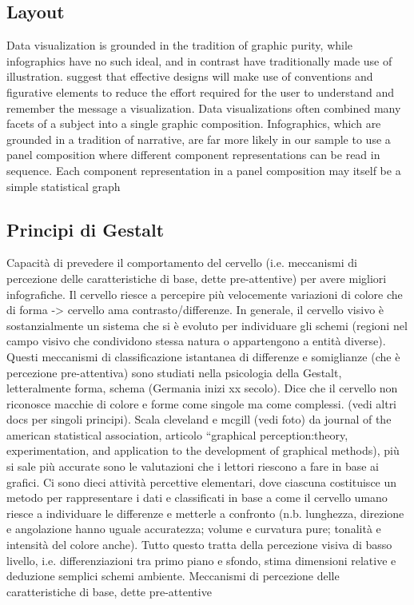 \subsection{Layout}\label{subsec:info_layout}

Data visualization is grounded in the tradition of graphic purity, while infographics have no such ideal, and in contrast have traditionally made use of illustration.
 suggest that effective designs will make use of conventions and figurative elements to reduce the effort required for the user to understand and remember the message a visualization.
Data
visualizations often combined many facets of a subject into a single
graphic composition. Infographics, which are grounded in a tradition
of narrative, are far more likely in our sample to use a panel
composition where different component representations can be read
in sequence. Each component representation in a panel composition
may itself be a simple statistical graph


\subsection{Principi di Gestalt}
Capacità di prevedere il comportamento del cervello (i.e. meccanismi di percezione delle caratteristiche di base, dette pre-attentive) per avere migliori infografiche.
Il cervello riesce a percepire più velocemente variazioni di colore che di forma -> cervello ama contrasto/differenze. In generale, il cervello visivo è sostanzialmente un sistema che si è evoluto per individuare gli schemi (regioni nel campo visivo che condividono stessa natura o appartengono a entità diverse). Questi meccanismi di classificazione istantanea di differenze e somiglianze (che è percezione pre-attentiva) sono studiati nella psicologia della Gestalt, letteralmente forma, schema (Germania inizi xx secolo). Dice che il cervello non riconosce macchie di colore e forme come singole ma come complessi.
(vedi altri docs per singoli principi).
Scala cleveland e mcgill (vedi foto) da journal of the american statistical association, articolo “graphical perception:theory, experimentation, and application to the development of graphical methods), più si sale più accurate sono le valutazioni che i lettori riescono a fare in base ai grafici. Ci sono dieci attività percettive elementari, dove ciascuna costituisce un metodo per rappresentare i dati e classificati in base a come il cervello umano riesce a individuare le differenze e metterle a confronto (n.b. lunghezza, direzione e angolazione hanno uguale accuratezza; volume e curvatura pure; tonalità e intensità del colore anche).
Tutto questo tratta della percezione visiva di basso livello, i.e. differenziazioni tra primo piano e sfondo, stima dimensioni relative e deduzione semplici schemi ambiente.
Meccanismi di percezione delle caratteristiche di base, dette pre-attentive


